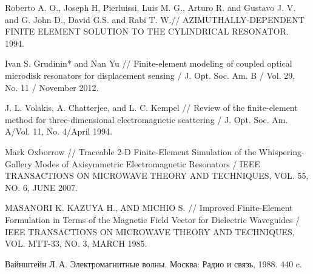 \documentclass[%
specialist,  %
subf,        %
href,        %
colorlinks,  %
]{disser}
\begin{document}

\clearpage


%



\printbibliography[heading=bibintoc]
\begin{thebibliography}{99}	
	 Roberto A. O., Joseph H, Pierluissi, Luis M. G., Arturo R. and Gustavo J. V. and G. John D., David G.S. and Rabi T. W.// AZIMUTHALLY-DEPENDENT FINITE ELEMENT SOLUTION TO THE CYLINDRICAL RESONATOR. 1994.
	
	  Ivan S. Grudinin* and Nan Yu // Finite-element modeling of coupled optical microdisk resonators for displacement sensing / J. Opt. Soc. Am. B / Vol. 29, No. 11 / November 2012.
	
	
	 J. L. Volakis, A. Chatterjee, and L. C. Kempel // Review of the finite-element method for three-dimensional electromagnetic scattering / J. Opt. Soc. Am. A/Vol. 11, No. 4/April 1994.
	
	
	 Mark Oxborrow // Traceable 2-D Finite-Element Simulation of the Whispering-Gallery Modes of Axisymmetric Electromagnetic Resonators / IEEE TRANSACTIONS ON MICROWAVE THEORY AND TECHNIQUES, VOL. 55, NO. 6, JUNE 2007.
	
	
	 MASANORI K. KAZUYA H., AND MICHIO S. // Improved Finite-Element Formulation in Terms of the Magnetic Field Vector for Dielectric Waveguides / IEEE TRANSACTIONS ON MICROWAVE THEORY AND TECHNIQUES, VOL. MTT-33, NO. 3, MARCH 1985.

	Вайнштейн Л.\,А. {Электромагнитные волны}. Москва: Радио и связь, 1988. 440 c.
	
\end{thebibliography}

%
\end{document}
